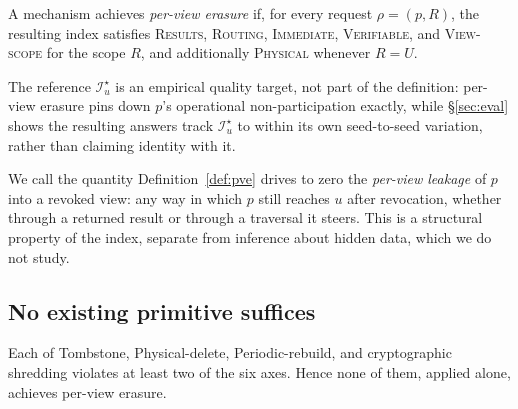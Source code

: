\documentclass[sigconf, nonacm, review]{acmart}
\begin{document}
\begin{definition}
\label{def:pve}
A mechanism achieves \emph{per-view erasure} if, for every request
$\rho=(p,R)$, the resulting index satisfies \textsc{Results},
\textsc{Routing}, \textsc{Immediate}, \textsc{Verifiable}, and
\textsc{View-scope} for the scope $R$, and additionally \textsc{Physical}
whenever $R=U$.
\end{definition}

The reference $\mathcal{I}^\star_u$ is an empirical quality target, not
part of the definition: per-view erasure pins down $p$'s operational
non-participation exactly, while \S\ref{sec:eval} shows the resulting
answers track $\mathcal{I}^\star_u$ to within its own seed-to-seed
variation, rather than claiming identity with it.

We call the quantity Definition~\ref{def:pve} drives to zero the
\emph{per-view leakage} of $p$ into a revoked view: any way in which $p$
still reaches $u$ after revocation, whether through a returned result or
through a traversal it steers. This is a structural property of the index,
separate from inference about hidden data, which we do not study.

\subsection{No existing primitive suffices}

\begin{theorem}
\label{thm:sixaxis}
Each of Tombstone, Physical-delete, Periodic-rebuild, and
cryptographic shredding violates at least two of the six axes. Hence none
of them, applied alone, achieves per-view erasure.
\end{theorem}
\end{document}
